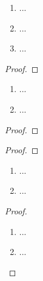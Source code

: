 \documentclass[12pt]{scrreprt}
\begin{document}
\begin{bem}\label{}
\begin{enumerate}
\item ...
\item ...
\item ...
\end{enumerate}
\end{bem}

\begin{kor}\label{}

\end{kor}
\begin{proof}

\end{proof}

\begin{satz}\label{}
\begin{enumerate}
\item ...
\item ...
\end{enumerate}
\end{satz}
\begin{bem*}

\end{bem*}
\begin{proof}

\end{proof}

\begin{bsp}\label{}

\end{bsp}
\begin{proof}

\end{proof}

\begin{kor}\label{}
\begin{enumerate}
\item ...
\item ...
\end{enumerate}
\end{kor}
\begin{bem*}

\end{bem*}
\begin{proof}
\begin{enumerate}
\item ...
\item ...
\end{enumerate}
\end{proof}

\begin{dfn}\label{}

\end{dfn}
\begin{bem*}

\end{bem*}
\end{document}
